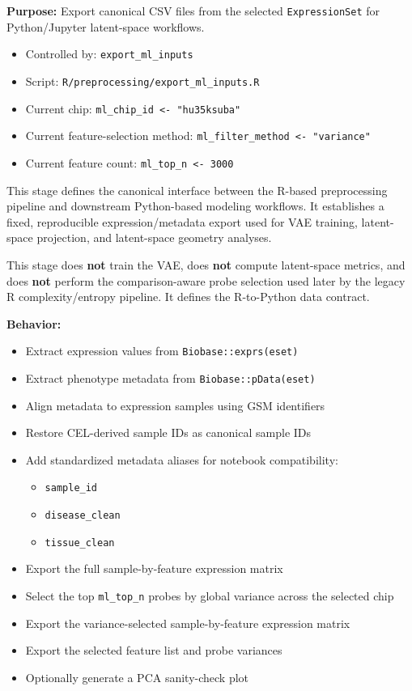 \documentclass[
  letterpaper,
  DIV=11,
  numbers=noendperiod,
  openany,
  oneside]{scrreprt}
\providecommand{\tightlist}{%
  \setlength{\itemsep}{0pt}\setlength{\parskip}{0pt}}
\begin{document}
\textbf{Purpose:} Export canonical CSV files from the selected
\texttt{ExpressionSet} for Python/Jupyter latent-space workflows.

\begin{itemize}
\tightlist
\item
  Controlled by: \texttt{export\_ml\_inputs}
\item
  Script: \texttt{R/preprocessing/export\_ml\_inputs.R}
\item
  Current chip: \texttt{ml\_chip\_id\ \textless{}-\ "hu35ksuba"}
\item
  Current feature-selection method:
  \texttt{ml\_filter\_method\ \textless{}-\ "variance"}
\item
  Current feature count: \texttt{ml\_top\_n\ \textless{}-\ 3000}
\end{itemize}

This stage defines the canonical interface between the R-based
preprocessing pipeline and downstream Python-based modeling workflows.
It establishes a fixed, reproducible expression/metadata export used for
VAE training, latent-space projection, and latent-space geometry
analyses.

This stage does \textbf{not} train the VAE, does \textbf{not} compute
latent-space metrics, and does \textbf{not} perform the comparison-aware
probe selection used later by the legacy R complexity/entropy pipeline.
It defines the R-to-Python data contract.

\textbf{Behavior:}

\begin{itemize}
\tightlist
\item
  Extract expression values from \texttt{Biobase::exprs(eset)}
\item
  Extract phenotype metadata from \texttt{Biobase::pData(eset)}
\item
  Align metadata to expression samples using GSM identifiers
\item
  Restore CEL-derived sample IDs as canonical sample IDs
\item
  Add standardized metadata aliases for notebook compatibility:

  \begin{itemize}
  \tightlist
  \item
    \texttt{sample\_id}
  \item
    \texttt{disease\_clean}
  \item
    \texttt{tissue\_clean}
  \end{itemize}
\item
  Export the full sample-by-feature expression matrix
\item
  Select the top \texttt{ml\_top\_n} probes by global variance across
  the selected chip
\item
  Export the variance-selected sample-by-feature expression matrix
\item
  Export the selected feature list and probe variances
\item
  Optionally generate a PCA sanity-check plot
\end{itemize}
\end{document}
